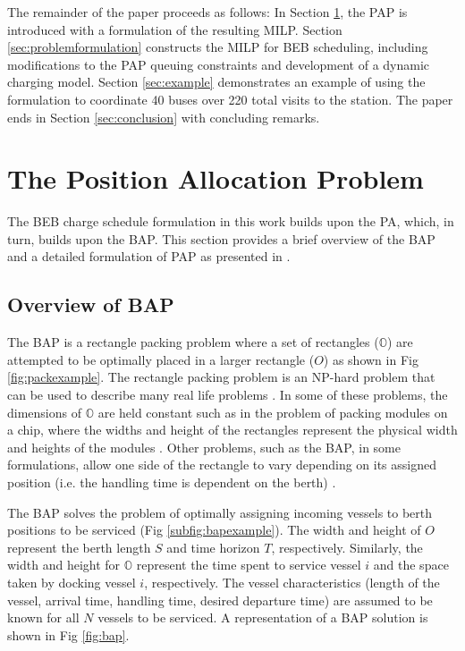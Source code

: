\documentclass[utf8]{FrontiersinHarvard}
\begin{document}
The remainder of the paper proceeds as follows: In Section \ref{sec:positionallocationproblem}, the PAP is introduced
with a formulation of the resulting MILP. Section \ref{sec:problemformulation} constructs the MILP for BEB scheduling, including modifications to the PAP queuing constraints and development of a dynamic charging model. Section \ref{sec:example} demonstrates an example of using the formulation to coordinate 40 buses over 220 total visits to the station. The paper ends in Section
\ref{sec:conclusion} with concluding remarks.

\section{The Position Allocation Problem}
\label{sec:positionallocationproblem}
The BEB charge schedule formulation in this work builds upon the PA, which, in turn, builds upon the BAP. This section provides a brief overview of the BAP and a detailed formulation of PAP as
presented in \citep{Qarebagh2019}.

\subsection{Overview of BAP}
The BAP is a rectangle packing problem where a set
of rectangles ($\mathbb{O}$) are attempted to be optimally placed in a larger rectangle ($O$) as shown in Fig
\ref{fig:packexample}. The rectangle packing problem is an NP-hard problem that can be used to describe many real life
problems \citep{Bruin2013,Murata1995}. In some of these problems, the dimensions of $\mathbb{O}$ are held constant such
as in the problem of packing modules on a chip, where the widths and height of the rectangles represent the physical
width and heights of the modules \citep{Murata1995}. Other problems, such as the BAP, in some formulations, allow one side of
the rectangle to vary depending on its assigned position (i.e. the handling time is dependent on the berth)
\citep{Buhrkal2010}.

The BAP solves the problem of optimally assigning incoming vessels to berth positions to be serviced (Fig
\ref{subfig:bapexample}). The width and height of $O$ represent the berth length $S$ and time horizon $T$, respectively.
Similarly, the width and height for $\mathbb{O}$ represent the time spent to service vessel $i$ and the space taken by
docking vessel $i$, respectively. The vessel characteristics (length of the vessel, arrival time, handling time, desired
departure time) are assumed to be known for all $N$ vessels to be serviced. A representation of a BAP solution is shown
in Fig \ref{fig:bap}.
\end{document}
